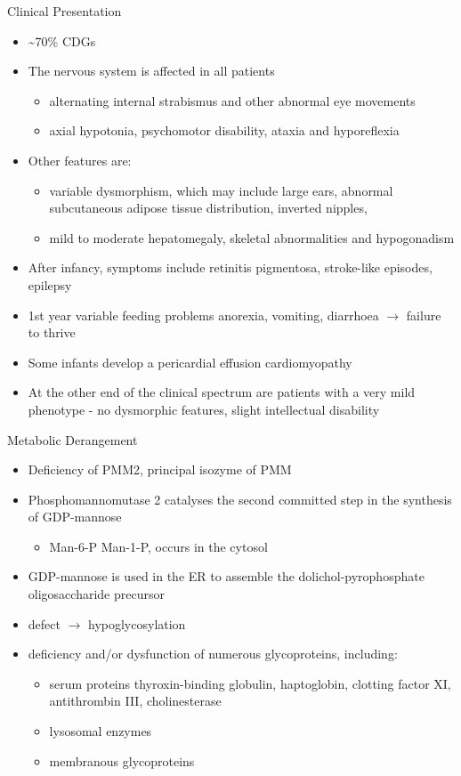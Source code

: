 \documentclass[presentation, smaller]{beamer}
\begin{document}
\begin{frame}[label={sec:org8ba946b}]{Clinical Presentation}
\begin{itemize}
\item \textasciitilde{}70\% CDGs
\item The nervous system is affected in all patients
\begin{itemize}
\item alternating internal strabismus and other abnormal eye movements
\item axial hypotonia, psychomotor disability, ataxia and hyporeflexia
\end{itemize}
\item Other features are:
\begin{itemize}
\item variable dysmorphism, which may include large ears, abnormal
subcutaneous adipose tissue distribution, inverted nipples,
\item mild to moderate hepatomegaly, skeletal abnormalities and hypogonadism
\end{itemize}
\item After infancy, symptoms include retinitis pigmentosa, stroke-like episodes, \textpm{} epilepsy
\item 1st year variable feeding problems anorexia, vomiting, diarrhoea \(\to\) failure to thrive
\item Some infants develop a pericardial effusion \textpm{} cardiomyopathy
\item At the other end of the clinical spectrum are patients with a very
mild phenotype - no dysmorphic features, slight intellectual disability
\end{itemize}
\end{frame}

\begin{frame}[label={sec:orgaed9bd1}]{Metabolic Derangement}
\begin{itemize}
\item Deficiency of PMM2, principal isozyme of PMM
\item Phosphomannomutase 2 catalyses the second committed step in the synthesis of GDP-mannose
\begin{itemize}
\item Man-6-P \ce{<=>} Man-1-P, occurs in the cytosol
\end{itemize}
\item GDP-mannose is used in the ER to assemble the dolichol-pyrophosphate
oligosaccharide precursor
\item defect \(\to\) hypoglycosylation
\item deficiency and/or dysfunction of numerous glycoproteins, including:
\begin{itemize}
\item serum proteins thyroxin-binding globulin, haptoglobin, clotting
factor XI, antithrombin III, cholinesterase
\item lysosomal enzymes
\item membranous glycoproteins
\end{itemize}
\end{itemize}
\end{frame}
\end{document}
